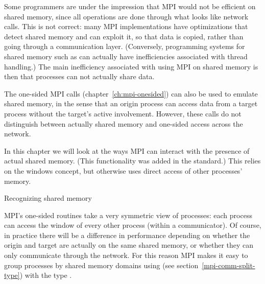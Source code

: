 

Some programmers are under the impression that MPI would not be efficient on
shared memory, since all operations are done through what looks like network calls.
This is not correct: many MPI
implementations have optimizations that detect shared memory and can
exploit it, so that data is copied, rather than going through a communication layer.
(Conversely, programming systems for shared memory such as 
can actually have inefficiencies associated with thread handling.)
The main inefficiency associated with using MPI on shared memory is then
that processes can not actually share data.

The one-sided MPI calls (chapter~\ref{ch:mpi-onesided}) can also be used to
emulate shared memory, in the sense that an origin process can access data
from a target process without the target's active involvement.
However, these calls do not distinguish between actually shared memory
and one-sided access across the network.

In this chapter we will look at the ways MPI
can interact with the presence of actual shared memory. 
(This functionality was added in the  standard.)
This relies on the  windows concept, but
otherwise uses direct access of other processes' memory.

 {Recognizing shared memory}
\label{mpi-comm-split-shared}

MPI's one-sided routines take a very symmetric view of processes:
each process can access the window of every other process (within a communicator).
Of course, in practice there will be a difference in performance
depending on whether the origin and target are actually
on the same shared memory, or whether they can only communicate through the network.
For this reason MPI makes it easy to group processes by shared memory domains
using 
(see section~\ref{mpi-comm-split-type})
with the type .


